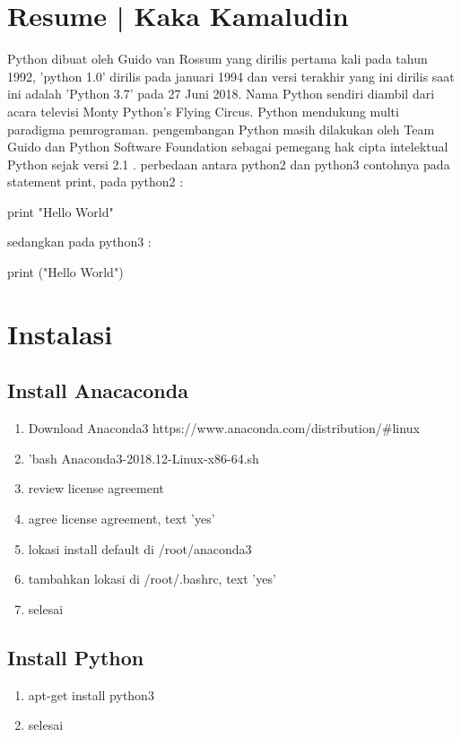 \section{Resume | Kaka Kamaludin}
\begin{flushleft}
\qquad Python dibuat oleh Guido van Rossum yang dirilis pertama  kali pada tahun 1992, 'python 1.0' dirilis pada januari 1994 dan versi terakhir yang ini dirilis saat ini adalah 'Python 3.7' pada 27 Juni 2018. Nama Python sendiri diambil dari acara televisi Monty Python's Flying Circus. Python mendukung multi paradigma pemrograman. pengembangan Python masih dilakukan oleh Team Guido dan Python Software Foundation sebagai pemegang hak cipta intelektual Python sejak versi 2.1 . perbedaan antara python2 dan python3 contohnya pada statement print, pada python2 : 

print "Hello World"

sedangkan pada python3 :

print ("Hello World")
\end{flushleft}

\section{Instalasi}
\subsection{Install Anacaconda}
\begin{enumerate}
\item Download Anaconda3 https://www.anaconda.com/distribution/#linux
\item 'bash Anaconda3-2018.12-Linux-x86-64.sh
\item review license agreement
\item agree license agreement, text 'yes'
\item lokasi install default di /root/anaconda3
\item tambahkan lokasi di /root/.bashrc, text 'yes'
\item selesai
\end{enumerate}

\subsection{Install Python}
\begin{enumerate}
\item apt-get install python3
\item selesai
\end{enumerate}

